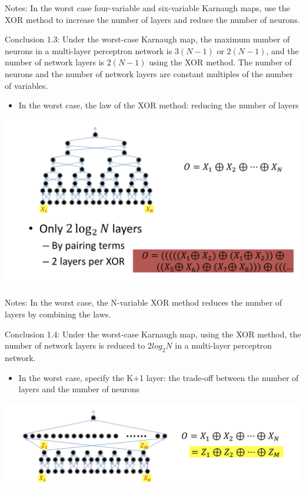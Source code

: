 \documentclass{article}
\begin{document}
	Notes: In the worst case four-variable and six-variable Karnaugh maps, use the XOR method to increase the number of layers and reduce the number of neurons.
	
	Conclusion 1.3: Under the worst-case Karnaugh map, the maximum number of neurons in a multi-layer perceptron network is $3 (N-1)$ or $2 (N-1)$, and the number of network layers is $2 (N-1)$ using the XOR method. The number of neurons and the number of network layers are constant multiples of the number of variables.
	
	\begin{itemize}
		\item In the worst case, the law of the XOR method: reducing the number of layers
	\end{itemize}
	
	\includegraphics[scale=0.2]{21.png}
	
	Notes: In the worst case, the N-variable XOR method reduces the number of layers by combining the laws.
	
	Conclusion 1.4: Under the worst-case Karnaugh map, using the XOR method, the number of network layers is reduced to $2log_2N$ in a multi-layer perceptron network. \\ 
	
	
	\begin{itemize}
		\item In the worst case, specify the K+1 layer: the trade-off between the number of layers and the number of neurons
	\end{itemize}
	
	\includegraphics[scale=0.2]{22.png}
	
\end{document}
